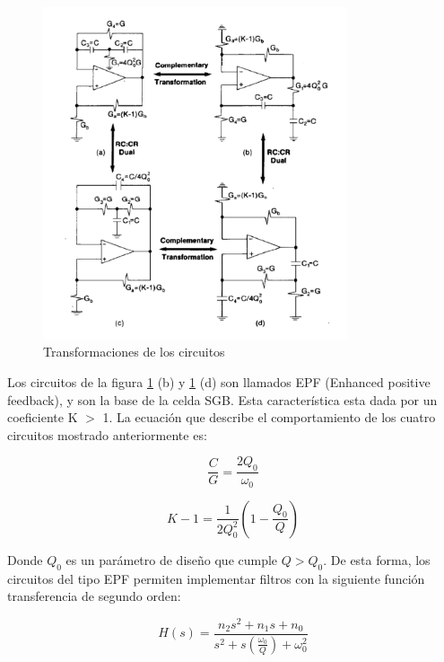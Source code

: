 \begin{figure}[h]
	\includegraphics[width=0.8\textwidth]{../Ejercicio2-DisenoDeCeldas/3CeldaSedra/Imagenes/Transformaciones SGB.png}
	\centering
	\caption{Transformaciones de los circuitos }
	\label{transSGM}
\end{figure}

Los circuitos de la figura \ref{transSGM} (b) y \ref{transSGM} (d) son llamados EPF (Enhanced positive feedback), y son la base de la celda SGB. Esta característica esta dada por un coeficiente K $>$ 1. La ecuación que describe el comportamiento de los cuatro circuitos mostrado anteriormente es:

\begin{equation}
	\frac{C}{G} = \frac{2Q_0}{\omega_0}
	\label{eq C/G}
\end{equation}

\begin{equation}
	K - 1 = \frac{1}{2Q_0^2} (1-\frac{Q_0}{Q})
	\label{eq K-1}
\end{equation}

Donde $Q_0$ es un parámetro de diseño que cumple $Q>Q_0$. De esta forma, los circuitos del tipo EPF permiten
implementar filtros con la siguiente función transferencia de segundo orden:

\begin{equation}
	H(s) = \frac{n_2 s^2 + n_1 s + n_0}{s^2 + s (\frac{\omega_0}{Q}) + \omega_0^2}
	\label{eq transferencia general}
\end{equation}

